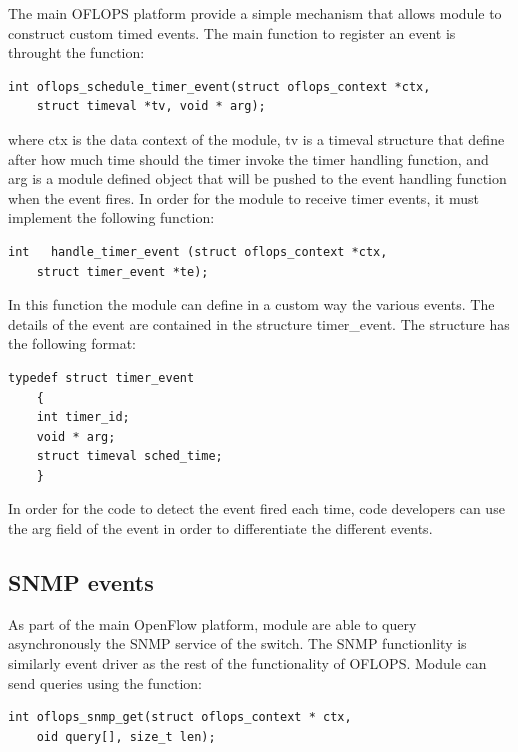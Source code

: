 \documentclass{book}
\begin{document}
The main OFLOPS platform provide a simple mechanism that allows module to construct custom timed events.
The main function to register an event is throught the function:

\begin{lstlisting}[caption={timer event callbacks}]
    int oflops_schedule_timer_event(struct oflops_context *ctx, 
    struct timeval *tv, void * arg);
\end{lstlisting}
where ctx is the data context of the module, tv is a timeval structure that define after how much
time should the timer invoke the timer handling function, and arg is a module defined object that will
be pushed to the event handling function when the event fires. In order for the module to receive timer 
events, it must implement the following function:
\begin{lstlisting}[caption={timer event registration}]
    int   handle_timer_event (struct oflops_context *ctx, 
    struct timer_event *te);
\end{lstlisting}

In this function the module can define in a custom way the various events. The details of the event 
are contained in the structure timer\_event. The structure has the following format:

\begin{lstlisting}[caption={event structure}]
    typedef struct timer_event
    {
    int timer_id;            
    void * arg;
    struct timeval sched_time;
    } 
\end{lstlisting}

In order for the code to detect the event fired each time, code developers can use the arg field of the 
event in order to differentiate the different events.

\subsection{SNMP events}

As part of the main OpenFlow platform, module are able to query asynchronously the SNMP service of the switch.
The SNMP functionlity is similarly event driver as the rest of the functionality of OFLOPS. Module can send queries
using the function:

\begin{lstlisting}[caption={asynchronous SNMP query}]
    int oflops_snmp_get(struct oflops_context * ctx, 
    oid query[], size_t len);
\end{lstlisting}
\end{document}
